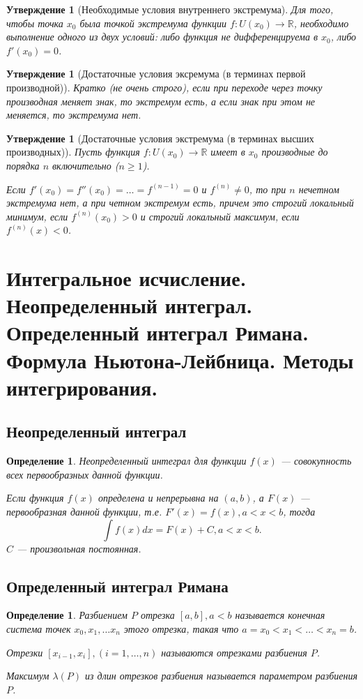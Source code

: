 \documentclass[12pt]{report}
\theoremstyle{plain}
\newtheorem{definition}[theorem]{Определение}
\newtheorem{statement}[theorem]{Утверждение}
\newcommand{\R}{\mathbb R}
\begin{document}
\begin{statement}[Необходимые условия внутреннего экстремума]
Для того, чтобы точка $x_0$ была точкой экстремума функции
$f: U(x_0) \rightarrow \R$, необходимо выполнение одного из двух условий:
либо функция не дифференцируема в $x_0$, либо $f'(x_0) = 0$.
\end{statement}

\begin{statement}[Достаточные условия эксремума (в терминах первой производной)]
Кратко (не очень строго), если при переходе через точку производная меняет знак,
то экстремум есть, а если знак при этом не меняется, то экстремума нет.
\end{statement}

\begin{statement}[Достаточные условия экстремума (в терминах высших производных)]
Пусть функция $f: U(x_0) \rightarrow \R$ имеет в $x_0$ производные до порядка $n$
включительно ($n \ge 1$).

Если $f'(x_0) = f''(x_0) = \dots = f^{(n-1)} = 0$ и $f^{(n)} \ne 0$, то при
$n$ нечетном экстремума нет, а при четном экстремум есть, причем это строгий
локальный минимум, если $f^{(n)}(x_0) > 0$ и строгий локальный максимум,
если $f^{(n)}(x) < 0$.
\end{statement}


\section
{
  Интегральное исчисление. Неопределенный интеграл. Определенный интеграл Римана.
  Формула Ньютона-Лейбница. Методы интегрирования.
}

\subsection{Неопределенный интеграл}
\begin{definition}
Неопределенный интеграл для функции $f(x)$ --- совокупность всех первообразных
данной функции.

Если функция $f(x)$ определена и непрерывна на $(a, b)$, а $F(x)$ --- первообразная
данной функции, т.е. $F'(x) = f(x), a < x < b$, тогда
$$
\int f(x) dx = F(x) + C, a < x < b.
$$
$C$ --- произвольная постоянная.
\end{definition}

\subsection{Определенный интеграл Римана}
\begin{definition}
Разбиением $P$ отрезка $[a, b], a < b$ называется конечная система точек
$x_0, x_1, \dots x_n$ этого отрезка, такая что $a = x_0 < x_1 < \dots < x_n = b$.

Отрезки $[x_{i-1}, x_i], (i=1, \dots, n)$ называются отрезками разбиения $P$.

Максимум $\lambda(P)$ из длин отрезков разбиения называется параметром разбиения $P$.
\end{definition}
\end{document}
